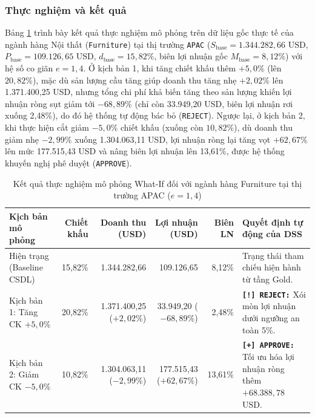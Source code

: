\subsubsection{Thực nghiệm và kết quả}

Bảng \ref{tab:what_if_results} trình bày kết quả thực nghiệm mô phỏng trên dữ liệu gốc thực tế của ngành hàng Nội thất (\texttt{Furniture}) tại thị trường \texttt{APAC} ($S_{\text{base}} = 1.344.282,66\text{ USD}$, $P_{\text{base}} = 109.126,65\text{ USD}$, $d_{\text{base}} = 15,82\%$, biên lợi nhuận gốc $M_{\text{base}} = 8,12\%$) với hệ số co giãn $e = 1,4$. Ở kịch bản 1, khi tăng chiết khấu thêm $+5,0\%$ (lên $20,82\%$), mặc dù sản lượng cầu tăng giúp doanh thu tăng nhẹ $+2,02\%$ lên 1.371.400,25 USD, nhưng tổng chi phí khả biến tăng theo sản lượng khiến lợi nhuận ròng sụt giảm tới $-68,89\%$ (chỉ còn 33.949,20 USD, biên lợi nhuận rơi xuống 2,48\%), do đó hệ thống tự động bác bỏ (\texttt{REJECT}). Ngược lại, ở kịch bản 2, khi thực hiện cắt giảm $-5,0\%$ chiết khấu (xuống còn $10,82\%$), dù doanh thu giảm nhẹ $-2,99\%$ xuống 1.304.063,11 USD, lợi nhuận ròng lại tăng vọt $+62,67\%$ lên mức 177.515,43 USD và nâng biên lợi nhuận lên 13,61\%, được hệ thống khuyến nghị phê duyệt (\texttt{APPROVE}).

\begin{table}[H]
\centering
\caption{Kết quả thực nghiệm mô phỏng What-If đối với ngành hàng Furniture tại thị trường APAC ($e=1,4$)}
\label{tab:what_if_results}
\footnotesize
\renewcommand{\arraystretch}{1.25}
\begin{tabularx}{\textwidth}{|l|r|r|r|r|X|}
\hline
\textbf{Kịch bản mô phỏng} & \textbf{Chiết khấu} & \textbf{Doanh thu (USD)} & \textbf{Lợi nhuận (USD)} & \textbf{Biên LN} & \textbf{Quyết định tự động của DSS} \\
\hline
Hiện trạng (Baseline CSDL) & 15,82\% & 1.344.282,66 & 109.126,65 & 8,12\% & Trạng thái tham chiếu hiện hành từ tầng Gold. \\
\hline
Kịch bản 1: Tăng CK $+5,0\%$ & 20,82\% & 1.371.400,25 ($+2,02\%$) & 33.949,20 ($-68,89\%$) & 2,48\% & \textbf{\texttt{[!] REJECT:}} Xói mòn lợi nhuận dưới ngưỡng an toàn 5\%. \\
\hline
Kịch bản 2: Giảm CK $-5,0\%$ & 10,82\% & 1.304.063,11 ($-2,99\%$) & 177.515,43 ($+62,67\%$) & 13,61\% & \textbf{\texttt{[+] APPROVE:}} Tối ưu hóa lợi nhuận ròng thêm $+68.388,78$ USD. \\
\hline
\end{tabularx}
\end{table}

